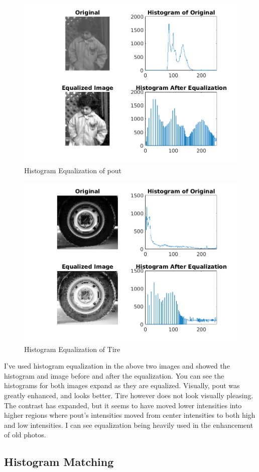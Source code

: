 \begin{figure}[H]
    \centering
    \includegraphics[scale=0.75]{pout_gray_equalize.png}
    \caption{Histogram Equalization of pout}
\end{figure}

\begin{figure}[H]
    \centering
    \includegraphics[scale=0.75]{Tire_gray_equalize.png}
    \caption{Histogram Equalization of Tire}
\end{figure}

I've used histogram equalization in the above two images and showed the
histogram and image before and after the equalization. You can see the
histograms for both images expand as they are equalized. Visually, pout was
greatly enhanced, and looks better. Tire however does not look visually
pleasing. The contrast has expanded, but it seems to have moved lower
intensities into higher regions where pout's intensities moved from center
intensities to both high and low intensities. I can see equalization being
heavily used in the enhancement of old photos.

\subsection{Histogram Matching}
